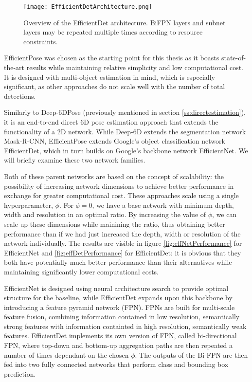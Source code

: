 \begin{figure}[ht]
    \centering
    \texttt{[image: EfficientDetArchitecture.png]}
    \caption{Overview of the EfficientDet architecture. BiFPN layers and subnet layers may be repeated multiple times according to resource constraints.}
\end{figure}

EfficientPose was chosen as the starting point for this thesis as it boasts state-of-the-art results while maintaining relative simplicity and low computational cost. It is designed with multi-object estimation in mind, which is especially significant, as other approaches do not scale well with the number of total detections.

Similarly to Deep-6DPose (previously mentioned in section \ref*{ss:directestimation}), it is an end-to-end direct 6D pose estimation approach that extends the functionality of a 2D network. While Deep-6D extends the segmentation network Mask-R-CNN, EfficientPose extends Google's object classification network EfficientDet\cite{EfficientDet}, which in turn builds on Google's backbone network EfficientNet\cite{EfficientNet}. We will briefly examine these two network families.

Both of these parent networks are based on the concept of scalability: the possibility of increasing network dimensions to achieve better performance in exchange for greater computational cost. These approaches scale using a single hyperparameter, $\phi$. For $\phi = 0$, we have a base network with minimum depth, width and resolution in an optimal ratio. By increasing the value of $\phi$, we can scale up these dimensions while mainining the ratio, thus obtaining better performance than if we had just increased the depth, width or resolution of the network individually. The results are visible in figure \ref{fig:effNetPerformance} for EfficientNet and \ref{fig:effDetPerformance} for EfficientDet: it is obvious that they both have potentially much better performance than their alternatives while maintaining significantly lower computational costs.

EfficientNet is designed using neural architecture search\cite{NAS} to provide optimal structure for the baseline, while EfficientDet expands upon this backbone by introducing a feature pyramid network\cite{FPN} (FPN). FPNs are built for multi-scale feature fusion, combining information contained in low resolution, semantically strong features with information containted in high resolution, semantically weak features. EfficientDet implements its own version of FPN, called bi-directional FPN, where top-down and bottom-up aggregation paths are then repeated a number of times dependant on the chosen $\phi$. The outputs of the Bi-FPN are then fed into two fully connected networks that perform class and bounding box prediction.

